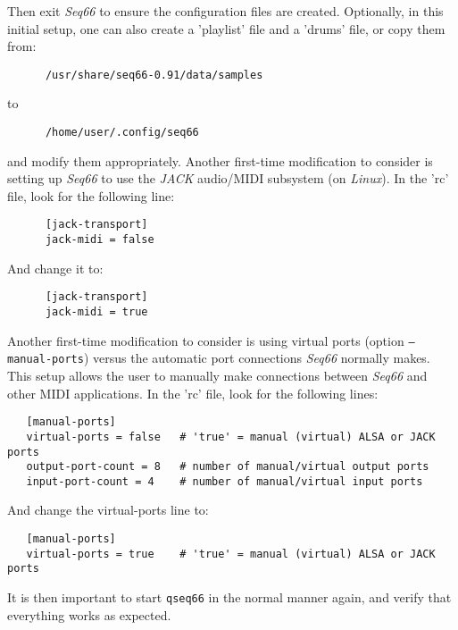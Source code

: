    Then exit \textsl{Seq66} to ensure the configuration files are created.
   Optionally, in this initial setup,
   one can also create a 'playlist' file and a 'drums' file, or
   copy them from:

   \begin{verbatim}
      /usr/share/seq66-0.91/data/samples
   \end{verbatim}

   to

   \begin{verbatim}
      /home/user/.config/seq66
   \end{verbatim}

   and modify them appropriately.
   Another first-time modification to consider is setting up \textsl{Seq66} to
   use the \textsl{JACK} audio/MIDI subsystem (on \textsl{Linux}).
   In the 'rc' file, look for the following line:

   \begin{verbatim}
      [jack-transport]
      jack-midi = false
   \end{verbatim}

   And change it to:

   \begin{verbatim}
      [jack-transport]
      jack-midi = true
   \end{verbatim}

   Another first-time modification to consider is using virtual ports (option
   \texttt{--manual-ports}) versus the automatic port connections
   \textsl{Seq66} normally makes.
   This setup allows the user to manually make connections between
   \textsl{Seq66} and other MIDI applications.
   In the 'rc' file, look for the following lines:

\begin{verbatim}
   [manual-ports]
   virtual-ports = false   # 'true' = manual (virtual) ALSA or JACK ports
   output-port-count = 8   # number of manual/virtual output ports
   input-port-count = 4    # number of manual/virtual input ports
\end{verbatim}

   And change the virtual-ports line to:

\begin{verbatim}
   [manual-ports]
   virtual-ports = true    # 'true' = manual (virtual) ALSA or JACK ports
\end{verbatim}

   It is then important to start \texttt{qseq66} in the normal manner again,
   and verify that everything works as expected.


